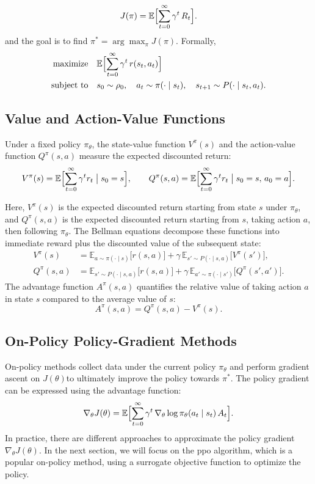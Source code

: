 \[
J(\pi) = \mathbb{E}\Bigl[\sum_{t=0}^\infty \gamma^t\,R_t\Bigr].
\]
and the goal is to find \(\pi^* = \arg\max_\pi J(\pi)\). Formally,
\begin{equation}\label{eq:RL_opt}
\begin{aligned}
\text{maximize} \quad & \mathbb{E}\Bigl[\sum_{t=0}^\infty \gamma^t\,r(s_t,a_t)\Bigr] \\
\text{subject to} \quad & s_0 \sim \rho_0, \quad a_t \sim \pi(\cdot\mid s_t), \quad s_{t+1} \sim P(\cdot\mid s_t,a_t).
\end{aligned}
\end{equation}

\subsection{Value and Action-Value Functions}
Under a fixed policy \(\pi_\theta\), the state-value function \(V^\pi(s)\) and the action-value function \(Q^\pi(s,a)\) measure the expected discounted return:
\[
V^\pi(s) = \mathbb{E}\Bigl[\sum_{t=0}^\infty \gamma^t r_t \;\big|\; s_0 = s\Bigr], 
\qquad
Q^\pi(s,a) = \mathbb{E}\Bigl[\sum_{t=0}^\infty \gamma^t r_t \;\big|\; s_0 = s,\,a_0 = a\Bigr].
\]

Here, \(V^\pi(s)\) is the expected discounted return starting from state \(s\) under \(\pi_\theta\), and \(Q^\pi(s,a)\) is the expected discounted return starting from \(s\), taking action \(a\), then following \(\pi_\theta\).
The Bellman equations decompose these functions into immediate reward plus the discounted value of the subsequent state:
\begin{align}
V^\pi(s)
&= \mathbb{E}_{a\sim\pi(\cdot\mid s)}\bigl[r(s,a)\bigr]
  + \gamma\,\mathbb{E}_{s'\sim P(\cdot\mid s,a)}\bigl[V^\pi(s')\bigr],\\
Q^\pi(s,a)
&= \mathbb{E}_{s'\sim P(\cdot\mid s,a)}\bigl[r(s,a)\bigr]
  + \gamma\,\mathbb{E}_{a'\sim\pi(\cdot\mid s')}\bigl[Q^\pi(s',a')\bigr].
\end{align}
The advantage function \(A^\pi(s,a)\) quantifies the relative value of taking action \(a\) in state \(s\) compared to the average value of \(s\):
\[
A^\pi(s,a) = Q^\pi(s,a) - V^\pi(s).
\]

\subsection{On-Policy Policy-Gradient Methods}
On-policy methods collect data under the current policy \(\pi_\theta\) and perform gradient ascent on \(J(\theta)\)to ultimately improve the policy towards \(\pi^*\). The policy gradient can be expressed using the advantage function:
\[
\nabla_\theta J(\theta)
= \mathbb{E}\Bigl[\sum_{t=0}^\infty \gamma^t\,\nabla_\theta \log \pi_\theta(a_t\mid s_t)\,A_t\Bigr].
\]
In practice, there are different approaches to approximate the policy gradient \(\nabla_{\theta}J(\theta)\). In the next section, we will focus on the \gls{ppo} algorithm, which is a popular on-policy method, using a surrogate objective function to optimize the policy.
